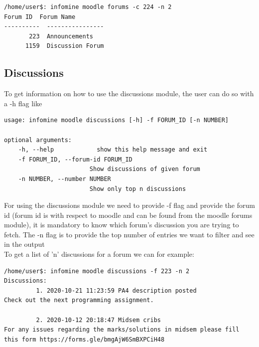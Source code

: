 \documentclass[12pt, a4paper]{article}
\begin{document}
\begin{verbatim}
/home/user$: infomine moodle forums -c 224 -n 2
Forum ID  Forum Name
----------  ----------------
       223  Announcements
      1159  Discussion Forum
\end{verbatim}

\subsection{Discussions}
To get information on how to use the discussions module, the user can do so with a -h flag like 
\begin{verbatim}
usage: infomine moodle discussions [-h] -f FORUM_ID [-n NUMBER]

optional arguments:
    -h, --help            show this help message and exit
    -f FORUM_ID, --forum-id FORUM_ID
                        Show discussions of given forum
    -n NUMBER, --number NUMBER
                        Show only top n discussions    
\end{verbatim}
For using the discussions module we need to provide -f flag and provide the forum id (forum id is with respect to moodle and can be found from the moodle forums module), it is mandatory to know which forum's discussion you are trying to fetch. The -n flag is to provide the top number of entries we want to filter and see in the output\\
To get a list of 'n' discussions for a forum we can for example:

\begin{verbatim}
/home/user$: infomine moodle discussions -f 223 -n 2
Discussions:
         1. 2020-10-21 11:23:59 PA4 description posted
Check out the next programming assignment. 

         2. 2020-10-12 20:18:47 Midsem cribs
For any issues regarding the marks/solutions in midsem please fill this form https://forms.gle/bmgAjW6SmBXPCiH48
\end{verbatim}
\end{document}
